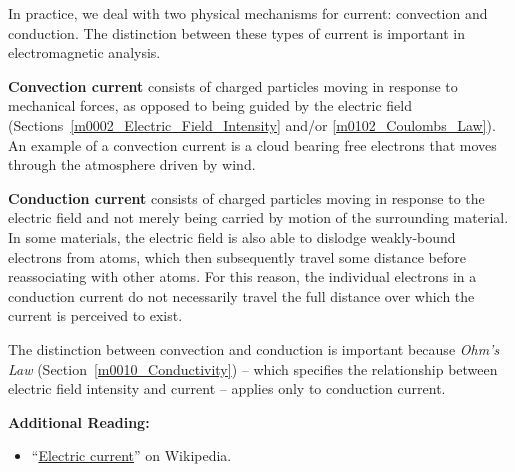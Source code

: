 

\label{m0110_Convection_and_Conduction} %

In practice, we deal with two physical mechanisms for current: convection and conduction.  
The distinction between these types of current is important in electromagnetic analysis. 

{\bf Convection current} 
consists of charged particles moving in response to mechanical forces, as opposed to being guided by the electric field (Sections~\ref{m0002_Electric_Field_Intensity} and/or \ref{m0102_Coulombs_Law}).  An example of a convection current is a cloud bearing free electrons that moves through the atmosphere driven by wind.

{\bf Conduction current} 
consists of charged particles moving in response to the electric field and not merely being carried by motion of the surrounding material.  
In some materials, the electric field is also able to dislodge weakly-bound electrons from atoms, which then subsequently travel some distance before reassociating with other atoms.  
For this reason, the individual electrons in a conduction current do not necessarily travel the full distance over which the current is perceived to exist. 

The distinction between convection and conduction is important because \emph{Ohm's Law} 
(Section~\ref{m0010_Conductivity}) -- which specifies the relationship between electric field intensity and current -- applies only to conduction current.


{\bf Additional Reading:}
\begin{itemize}
\item ``\href{https://en.wikipedia.org/wiki/Electric_current}{Electric current}'' on Wikipedia.
\end{itemize}








